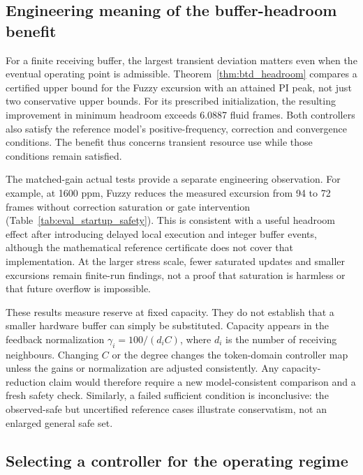 \subsection{Engineering meaning of the buffer-headroom benefit}
\label{subsec:discussion_headroom}

For a finite receiving buffer, the largest transient deviation matters
even when the eventual operating point is admissible.
Theorem~\ref{thm:btd_headroom} compares a certified upper bound for the
Fuzzy excursion with an attained PI peak, not just two conservative
upper bounds. For its prescribed initialization, the resulting
improvement in minimum headroom exceeds 6.0887 fluid frames. Both
controllers also satisfy the reference model's positive-frequency,
correction and convergence conditions. The benefit thus concerns
transient resource use while those conditions remain satisfied.

The matched-gain actual tests provide a separate engineering observation.
For example, at 1600 ppm, Fuzzy reduces the measured excursion from
94 to 72 frames without correction saturation or gate intervention
(Table~\ref{tab:eval_startup_safety}). This is consistent with a useful
headroom effect after introducing delayed local execution and integer
buffer events, although the mathematical reference certificate does
not cover that implementation. At the larger stress scale, fewer
saturated updates and smaller excursions remain finite-run findings,
not a proof that saturation is harmless or that future overflow is
impossible.

These results measure reserve at fixed capacity. They do not establish
that a smaller hardware buffer can simply be substituted. Capacity
appears in the feedback normalization
$\gamma_i=100/(d_iC)$, where $d_i$ is the number of receiving neighbours.
Changing $C$ or the degree changes the token-domain controller map
unless the gains or normalization are adjusted consistently. Any
capacity-reduction claim would therefore require a new model-consistent
comparison and a fresh safety check. Similarly, a failed sufficient
condition is inconclusive: the observed-safe but uncertified reference cases
illustrate conservatism, not an enlarged general safe set.

\subsection{Selecting a controller for the operating regime}
\label{subsec:discussion_selection}

